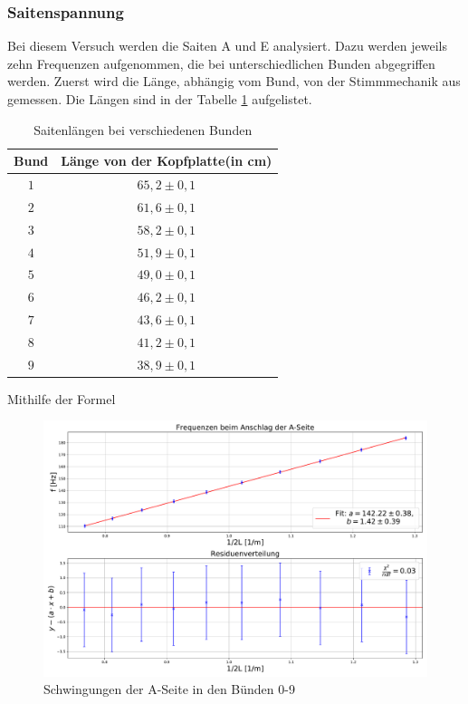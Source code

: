 \documentclass[a4paper, 11pt]{article}
\begin{document}
\subsubsection{Saitenspannung}
Bei diesem Versuch werden die Saiten A und E analysiert. Dazu werden jeweils zehn Frequenzen aufgenommen, die bei unterschiedlichen Bunden abgegriffen werden. Zuerst wird die Länge, abhängig vom Bund, von der Stimmmechanik aus gemessen. Die Längen sind in der Tabelle \ref{Saitenlängen bei verschiedenen Bunden} aufgelistet.
\begin{table}[H]
\centering
\begin{tabular}{|c|c|}
\hline Bund & Länge von der Kopfplatte(in cm) \\
\hline $1$ & $65,2 \pm 0,1$ \\
$2$ & $61,6 \pm 0,1$ \\
$3$ & $58,2 \pm 0,1$ \\
$4$ & $51,9 \pm 0,1$ \\
$5$ & $49,0 \pm 0,1$ \\
$6$ & $46,2 \pm 0,1$ \\
$7$ & $43,6 \pm 0,1$ \\
$8$ & $41,2 \pm 0,1$ \\
$9$ & $38,9 \pm 0,1$ \\
\hline
\end{tabular}
\caption{Saitenlängen bei verschiedenen Bunden}
\label{Saitenlängen bei verschiedenen Bunden}
\end{table}
Mithilfe der Formel
\begin{figure}[H]
	\centering
	\includegraphics[scale=0.4]{../Plots/A-Seite.pdf}
	\caption{Schwingungen der A-Seite in den Bünden 0-9}
	\label{fig:ASaite}
\end{figure}
\end{document}
